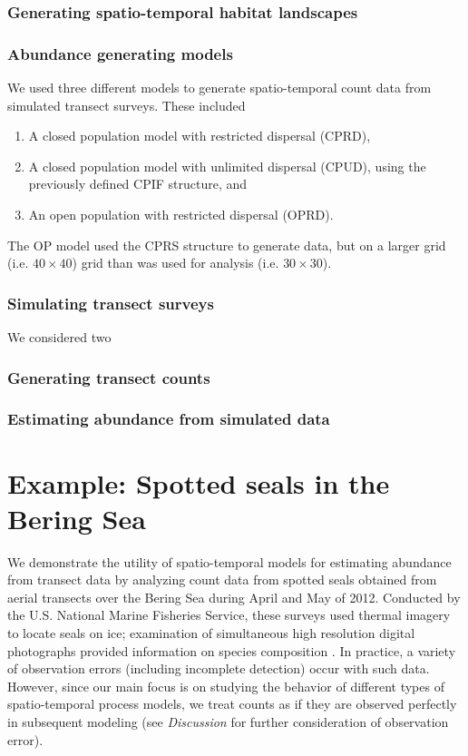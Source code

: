 \documentclass[times,mee,doublespace,]{besauth2}
\begin{document}
\subsubsection{Generating spatio-temporal habitat landscapes}



\subsubsection{Abundance generating models}

We used three different models to generate spatio-temporal count data from simulated transect surveys.  These included
\begin{enumerate}
   \item  A closed population model with restricted dispersal (CPRD), 
   \item A closed population model with unlimited dispersal (CPUD), using the previously defined CPIF structure, and
   \item An open population with restricted dispersal (OPRD).
\end{enumerate}
The OP model used the CPRS structure to generate data, but on a larger grid (i.e. $40 \times 40$) grid than was used for analysis (i.e. $30 \times 30$).

\subsubsection{Simulating transect surveys}

We considered two 

\subsubsection{Generating transect counts}

\subsubsection{Estimating abundance from simulated data}


\section{Example: Spotted seals in the Bering Sea}

We demonstrate the utility of spatio-temporal models for estimating abundance from transect data by analyzing
count data from spotted seals obtained from aerial transects over the Bering Sea during April and May of 2012.  Conducted by the U.S. National Marine Fisheries Service, these surveys used thermal imagery to locate seals on ice; examination of simultaneous high resolution digital photographs provided information on species composition \citep[for detailed information on survey methods, see][]{ConnEtAl2014}.  In practice, a variety of observation errors (including incomplete detection) occur with such data.  However, since our main focus is on studying the behavior of different types of spatio-temporal process models, we treat counts as if they are observed perfectly in subsequent modeling (see {\it Discussion} for further consideration of observation error).
\end{document}
